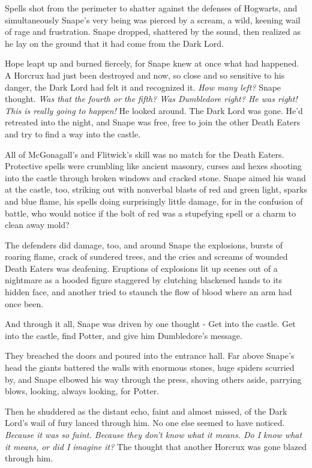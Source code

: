 Spells shot from the perimeter to shatter against the defenses of Hogwarts, and simultaneously Snape's very being was pierced by a scream, a wild, keening wail of rage and frustration. Snape dropped, shattered by the sound, then realized as he lay on the ground that it had come from the Dark Lord.

Hope leapt up and burned fiercely, for Snape knew at once what had happened. A Horcrux had just been destroyed and now, so close and so sensitive to his danger, the Dark Lord had felt it and recognized it. \emph{How many left?} Snape thought. \emph{Was that the fourth or the fifth? Was Dumbledore right? He was right! This is really going to happen!} He looked around. The Dark Lord was gone. He'd retreated into the night, and Snape was free, free to join the other Death Eaters and try to find a way into the castle.

All of McGonagall's and Flitwick's skill was no match for the Death Eaters. Protective spells were crumbling like ancient masonry, curses and hexes shooting into the castle through broken windows and cracked stone. Snape aimed his wand at the castle, too, striking out with nonverbal blasts of red and green light, sparks and blue flame, his spells doing surprisingly little damage, for in the confusion of battle, who would notice if the bolt of red was a stupefying spell or a charm to clean away mold?

The defenders did damage, too, and around Snape the explosions, bursts of roaring flame, crack of sundered trees, and the cries and screams of wounded Death Eaters was deafening. Eruptions of explosions lit up scenes out of a nightmare as a hooded figure staggered by clutching blackened hands to its hidden face, and another tried to staunch the flow of blood where an arm had once been.

And through it all, Snape was driven by one thought - Get into the castle. Get into the castle, find Potter, and give him Dumbledore's message.

They breached the doors and poured into the entrance hall. Far above Snape's head the giants battered the walls with enormous stones, huge spiders scurried by, and Snape elbowed his way through the press, shoving others aside, parrying blows, looking, always looking, for Potter.

Then he shuddered as the distant echo, faint and almost missed, of the Dark Lord's wail of fury lanced through him. No one else seemed to have noticed. \emph{Because it was so faint. Because they don't know what it means. Do I know what it means, or did I imagine it?} The thought that another Horcrux was gone blazed through him.

